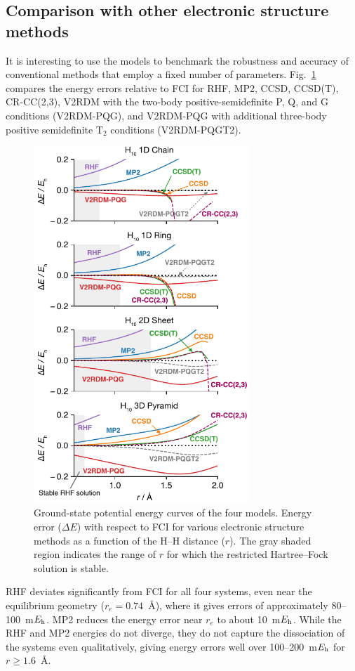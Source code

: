 \documentclass[aip,jcp,amsmath,amssymb, reprint]{revtex4-1}
\newcommand*{\Eh}{$E_{\rm h}$\xspace}
\begin{document}
\subsection{\label{sec:trad_methods}Comparison with other electronic structure methods}

It is interesting to use the  models to benchmark the robustness and accuracy of conventional  methods that employ a fixed number of parameters.
Fig.~\ref{fig:comon_method_errors} compares the energy errors relative to FCI for RHF, MP2, CCSD, CCSD(T), CR-CC(2,3), V2RDM with the two-body positive-semidefinite P, Q, and G conditions (V2RDM-PQG), and V2RDM-PQG with additional three-body positive semidefinite T$_2$ conditions (V2RDM-PQGT2).
\begin{figure}[h!]
\centering
\includegraphics[width=3.2in]{figure_6.pdf}
\caption{Ground-state potential energy curves of the four  models. Energy error ($\Delta E$) with respect to FCI for various electronic structure methods as a function of the H--H distance ($r$). The gray shaded region indicates the range of $r$ for which the restricted Hartree--Fock solution is stable.}
\label{fig:comon_method_errors}
\end{figure}
RHF deviates significantly from FCI for all four systems, even near the  equilibrium geometry ($r_e=0.74$~{\AA}), where it gives errors of approximately 80--100~m\Eh. 
MP2 reduces the energy error near $r_e$ to about 10~m\Eh.   
While the RHF and MP2 energies do not diverge, they do not capture the dissociation of the  systems even qualitatively, giving energy errors well over 100--200~m\Eh for $r\geq1.6$~{\AA}. 
\end{document}
